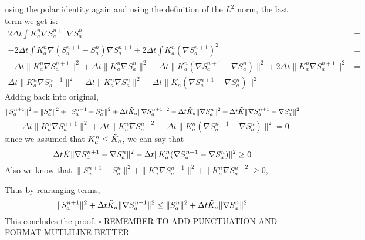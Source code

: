 using the polar identity again and using the definition of the $L^2$ norm, the
last term we get is:
\begin{align*}
	2 \Delta t \int K_a^{n} \nabla S_a^{n+1} \nabla S_a^{n} &= \\
	-2 \Delta t \int K_a^n \nabla(S_a^{n+1} - S_a^n)\nabla
	S_a^{n+1} + 2 \Delta t \int K_a^n (\nabla S_a^{n+1})^2 &= \\-\Delta t \|
	K_a^{n} \nabla S_a^{n+1} \|^2 + \Delta t \| K_a^n \nabla S_a^n \|^2 -
	\Delta t \| K_a^n(\nabla S_a^{n+1} - \nabla S_a^n) \|^2 + 2 \Delta t \|
	K_a^n \nabla S_a^{n+1} \|^2 &= \\ \Delta t \| K_a^n \nabla S_a^{n+1}
	\|^2 + \Delta t \| K_a^n \nabla S_a^n \|^2 - \Delta t \| K_a(\nabla
	S_a^{n+1} - \nabla S_a^n) \|^2
\end{align*}
Adding back into original,
\[
\| S_a^{n+1} \|^2-\| S_a^{n} \|^2 + \| S_a^{n+1} - S_a^{n} \|^2+
\Delta t \Tilde{K}_a \|\nabla S_a^{n+1} \|^2-   \Delta t
\Tilde{K}_a \| \nabla S_a^{n} \|^2 + \Delta t \Tilde{K} \|
\nabla S_a^{n+1} - \nabla S_a^{n} \|^2
\]
\[
+ \Delta t \| K_a^n \nabla S_a^{n+1}
\|^2 + \Delta t \| K_a^n \nabla S_a^n \|^2 - \Delta t \| K_a^n(\nabla
S_a^{n+1} - \nabla S_a^n) \|^2 = 0
\]
since we assumed that $ K_a^n \leq \Tilde{K}_a$, we can say that 
\[
\Delta t \Tilde{K} \|
\nabla S_a^{n+1} - \nabla S_a^{n} \|^2  - \Delta t \| K_a^n(\nabla
S_a^{n+1} - \nabla S_a^n) \|^2 \geq 0
\]
Also we know that $ \| S_a^{n+1} - S_a^{n} \|^2 + \| K_a^n \nabla S_a^{n+1}
\|^2 + \| K_a^n \nabla S_a^n \|^2  \geq 0$,

Thus by rearanging terms,
\[
\| S_a^{n+1} \|^2 +\Delta t \Tilde{K}_a \|\nabla S_a^{n+1} \|^2 \leq
\| S_a^{n} \|^2 +  \Delta t
\Tilde{K}_a \| \nabla S_a^{n} \|^2 
\]
This concludes the proof. $\square$
REMEMBER TO ADD PUNCTUATION AND FORMAT MUTLILINE BETTER

